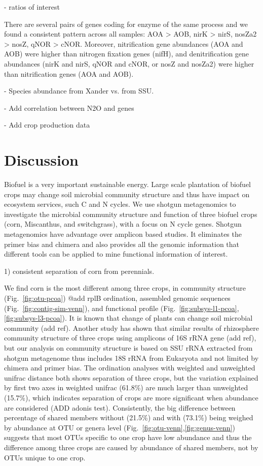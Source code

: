 \documentclass[12pt]{article}
\begin{document}
- ratios of interest

There are several pairs of genes coding for enzyme of the same process and we found a consistent pattern across all samples: AOA {\textgreater} AOB, nirK {\textgreater} nirS, nosZa2 {\textgreater} nosZ, qNOR {\textgreater} cNOR. Moreover, nitrification gene abundances (AOA and AOB) were higher than nitrogen fixation genes (nifH), and denitrification gene abundances (nirK and nirS, qNOR and cNOR, or nosZ and nosZa2) were higher than nitrification genes (AOA and AOB).

- Species abundance from Xander vs. from SSU.

- Add correlation between N2O and genes

- Add crop production data

\section{Discussion}

Biofuel is a very important sustainable energy. Large scale plantation of biofuel crops may change soil microbial community structure and thus have impact on ecosystem services, such C and N cycles. We use shotgun metagenomics to investigate the microbial community structure and function of three biofuel crops (corn, Miscanthus, and switchgrass), with a focus on N cycle genes. Shotgun metagenomics have advantage over amplicon based studies. It eliminates the primer bias and chimera and also provides all the genomic information that different tools can be applied to mine functional information of interest.

1) consistent separation of corn from perennials.

We find corn is the most different among three crops, in community structure (Fig.~\ref{fig:otu-pcoa}) @add rplB ordination, assembled genomic sequences (Fig.~\ref{fig:contig-sim-venn}), and functional profile (Fig.~\ref{fig:subsys-l1-pcoa},\ref{fig:subsys-l3-pcoa}). It is known that change of plants can change soil microbial community (add ref). Another study has shown that similar results of rhizosphere community structure of three crops using amplicons of 16S rRNA gene (add ref), but our analysis on community structure is based on SSU rRNA extracted from shotgun metagenome thus includes 18S rRNA from Eukaryota and not limited by chimera and primer bias. The ordination analyses with weighted and unweighted unifrac distance both shows separation of three crops, but the variation explained by first two axes in weighted unifrac (61.8\%) are much larger than unweighted (15.7\%), which indicates separation of crops are more significant when abundance are considered (ADD adonis test). Consistently, the big difference between percentage of shared members without (21.5\%) and with (73.1\%) being weighed by abundance at OTU or genera level (Fig.~\ref{fig:otu-venn},\ref{fig:genus-venn}) suggests that most OTUs specific to one crop have low abundance and thus the difference among three crops are caused by abundance of shared members, not by OTUs unique to one crop. 
\end{document}
